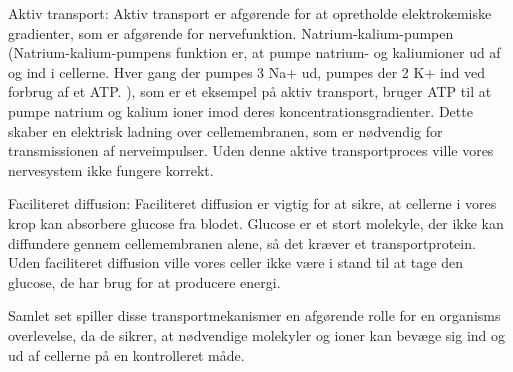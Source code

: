             Aktiv transport: Aktiv transport er afgørende for at opretholde elektrokemiske gradienter, som er afgørende for nervefunktion. Natrium-kalium-pumpen (Natrium-kalium-pumpens funktion er, at pumpe natrium- og kaliumioner ud af og ind i cellerne. Hver gang der pumpes 3 Na+ ud, pumpes der 2 K+ ind ved forbrug af et ATP. ), som er et eksempel på aktiv transport, bruger ATP til at pumpe natrium og kalium ioner imod deres koncentrationsgradienter. Dette skaber en elektrisk ladning over cellemembranen, som er nødvendig for transmissionen af nerveimpulser. Uden denne aktive transportproces ville vores nervesystem ikke fungere korrekt.

            Faciliteret diffusion: Faciliteret diffusion er vigtig for at sikre, at cellerne i vores krop kan absorbere glucose fra blodet. Glucose er et stort molekyle, der ikke kan diffundere gennem cellemembranen alene, så det kræver et transportprotein. Uden faciliteret diffusion ville vores celler ikke være i stand til at tage den glucose, de har brug for at producere energi.

            Samlet set spiller disse transportmekanismer en afgørende rolle for en organisms overlevelse, da de sikrer, at nødvendige molekyler og ioner kan bevæge sig ind og ud af cellerne på en kontrolleret måde.
